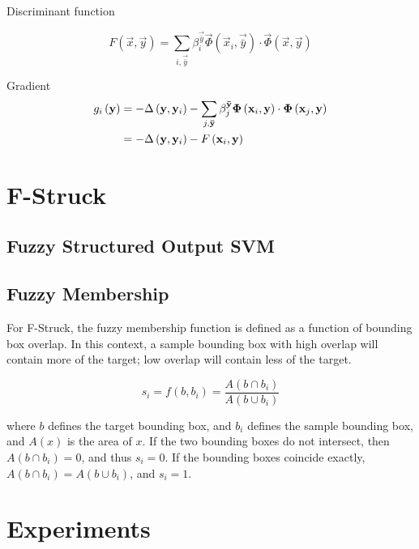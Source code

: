 \documentclass{IEEEtran}
\begin{document}
Discriminant function

\begin{displaymath}
    F(\vec{x}, \vec{y}) = \sum_{i,\vec{\bar{y}}} \beta_i^\vec{\bar{y}}
    \vec{\Phi}\left(\vec{x}_i, \vec{\bar{y}}\right) \cdot \vec{\Phi}\left(\vec{x},
    \vec{y}\right)
\end{displaymath}

Gradient
\begin{align}
    g_i\left(\mathbf{y}\right) &= - \Delta\left(\mathbf{y}, \mathbf{y}_i\right) - \sum_{j,\mathbf{\bar{y}}} \beta_j^{\mathbf{\bar{y}}}
    \mathbf{\Phi}\left(\mathbf{x}_i, \mathbf{y}\right) \cdot \mathbf{\Phi}\left(\mathbf{x}_j,
    \mathbf{y}\right) \\
    &= - \Delta\left(\mathbf{y}, \mathbf{y}_i\right) - F\left(\mathbf{x}_i, \mathbf{y}\right) \nonumber
\end{align}

\section{F-Struck} %

\subsection{Fuzzy Structured Output SVM}

\subsection{Fuzzy Membership} %
For F-Struck, the fuzzy membership function is defined as a function of bounding box overlap. In
this context, a sample bounding box with high overlap will contain more of the target; low overlap
will contain less of the target.

\begin{displaymath}
    s_i = f\left(b, b_i\right) = \frac{A(b \cap b_i)}{A(b \cup b_i)}
\end{displaymath}

where \(b\) defines the target bounding box, and \(b_i\) defines the sample bounding box, and
\(A(x)\) is the area of \(x\). If the two bounding boxes do not intersect, then \(A\left(b \cap
b_i\right) = 0\), and thus \(s_i = 0\). If the bounding boxes coincide exactly,
\(A\left(b \cap b_i\right) = A\left(b \cup b_i\right)\), and \(s_i = 1\).

\section{Experiments}
\end{document}
